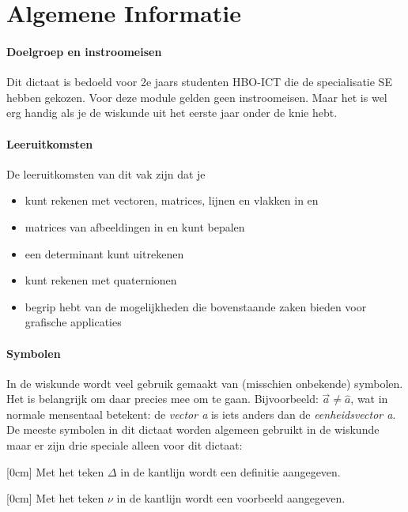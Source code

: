 \chapter{Algemene Informatie}
\label{chap:algemeneinformatie}

\subsubsection{Doelgroep en instroomeisen}
Dit dictaat is bedoeld voor 2e jaars studenten HBO-ICT die de specialisatie SE hebben gekozen. Voor deze module gelden geen instroomeisen. Maar het is wel erg handig als je de wiskunde uit het eerste jaar onder de knie hebt.

\subsubsection*{Leeruitkomsten}
De leeruitkomsten van dit vak zijn dat je
\begin{itemize}
        \setlength\itemsep{-1pt}
        \item kunt rekenen met vectoren, matrices, lijnen en vlakken  in \RT en \RD
        \item matrices van afbeeldingen in \RT en \RD kunt bepalen
        \item een determinant kunt uitrekenen
        \item kunt rekenen met quaternionen
        \item begrip hebt van de mogelijkheden die bovenstaande zaken bieden voor grafische applicaties
    \end{itemize}

\subsubsection{Symbolen}
In de wiskunde wordt veel gebruik gemaakt van (misschien onbekende) symbolen. Het is belangrijk om daar precies mee om te gaan. Bijvoorbeeld: $ \vec{a} \ne \hat{a} $, wat in normale mensentaal betekent: de \textit{vector a} is iets anders dan de \textit{eenheidsvector a}. 
De meeste symbolen in dit dictaat worden algemeen gebruikt in de wiskunde maar er zijn drie speciale alleen voor dit dictaat:

[0cm]
Met het teken {\color{nhl_blue} \Large $ \Delta $ }in de kantlijn wordt een definitie aangegeven.

[0cm]
Met het teken {\color{nhl_blue} \LARGE $ \nu $ }  in de kantlijn wordt een voorbeeld aangegeven.

